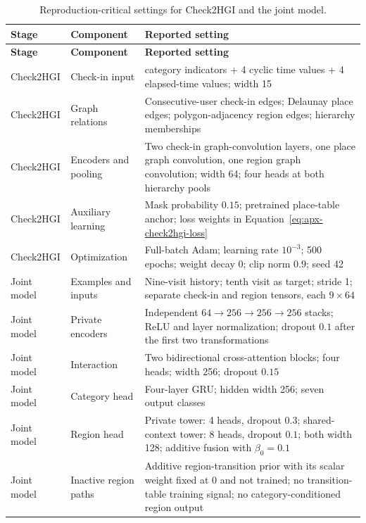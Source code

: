 {\small
\begin{longtable}{>{\raggedright\arraybackslash}p{}
                  >{\raggedright\arraybackslash}p{}
                  >{\raggedright\arraybackslash}p{}}
\caption{Reproduction-critical settings for Check2HGI and the joint model.}
\label{tab:apx-active-settings}\\
\toprule
\textbf{Stage} & \textbf{Component} & \textbf{Reported setting} \\
\midrule
\endfirsthead
\toprule
\textbf{Stage} & \textbf{Component} & \textbf{Reported setting} \\
\midrule
\endhead
Check2HGI & Check-in input & 7 category indicators + 4 cyclic time values + 4 elapsed-time values; width 15 \\
Check2HGI & Graph relations & Consecutive-user check-in edges; Delaunay place edges; polygon-adjacency region edges; hierarchy memberships \\
Check2HGI & Encoders and pooling & Two check-in graph-convolution layers, one place graph convolution, one region graph convolution; width 64; four heads at both hierarchy pools \\
Check2HGI & Auxiliary learning & Mask probability $0.15$; pretrained place-table anchor; loss weights in Equation~\ref{eq:apx-check2hgi-loss} \\
Check2HGI & Optimization & Full-batch Adam; learning rate $10^{-3}$; 500 epochs; weight decay 0; clip norm $0.9$; seed 42 \\
Joint model & Examples and inputs & Nine-visit history; tenth visit as target; stride 1; separate check-in and region tensors, each $9\times64$ \\
Joint model & Private encoders & Independent $64\rightarrow256\rightarrow256\rightarrow256$ stacks; ReLU and layer normalization; dropout $0.1$ after the first two transformations \\
Joint model & Interaction & Two bidirectional cross-attention blocks; four heads; width 256; dropout $0.15$ \\
Joint model & Category head & Four-layer GRU; hidden width 256; seven output classes \\
Joint model & Region head & Private tower: 4 heads, dropout $0.3$; shared-context tower: 8 heads, dropout $0.1$; both width 128; additive fusion with $\beta_0=0.1$ \\
Joint model & Inactive region paths & Additive region-transition prior with its scalar weight fixed at 0 and not trained; no transition-table training signal; no category-conditioned region output \\

\end{longtable}}
